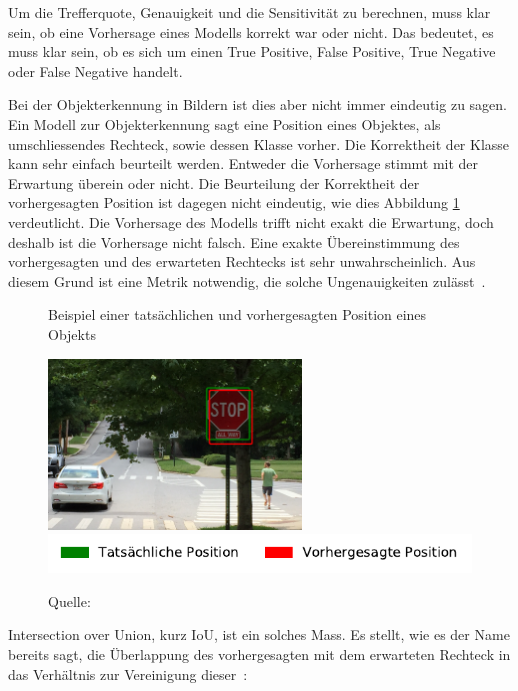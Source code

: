 Um die Trefferquote, Genauigkeit und die Sensitivität zu berechnen, muss klar sein, ob eine Vorhersage eines Modells korrekt war oder nicht. Das bedeutet, es muss klar sein, ob es sich um einen True Positive, False Positive, True Negative oder False Negative handelt. 

Bei der Objekterkennung in Bildern ist dies aber nicht immer eindeutig zu sagen. Ein Modell zur Objekterkennung sagt eine Position eines Objektes, als umschliessendes Rechteck, sowie dessen Klasse vorher. Die Korrektheit der Klasse kann sehr einfach beurteilt werden. Entweder die Vorhersage stimmt mit der Erwartung überein oder nicht. Die Beurteilung der Korrektheit der vorhergesagten Position ist dagegen nicht eindeutig, wie dies Abbildung \ref{fig:iou-issue} verdeutlicht. Die Vorhersage des Modells trifft nicht exakt die Erwartung, doch deshalb ist die Vorhersage nicht falsch. Eine exakte Übereinstimmung des vorhergesagten und des erwarteten Rechtecks ist sehr unwahrscheinlich. Aus diesem Grund ist eine Metrik notwendig, die solche Ungenauigkeiten zulässt~\autocite{IoU}.

\begin{figure}[h!]
    \captionsetup{width=.9\linewidth}
    \caption{Beispiel einer tatsächlichen und vorhergesagten Position eines Objekts}
    \label{fig:iou-issue}
    \centering
    \includegraphics[width=0.6\textwidth]{graphics/iou/iou_issue.jpg}\\
    \includegraphics[scale=1]{graphics/matplot/iou_issue_legend.pdf}
    \caption*{Quelle: \textcite{IoU}}
\end{figure}

Intersection over Union, kurz IoU, ist ein solches Mass. Es stellt, wie es der Name bereits sagt, die Überlappung des vorhergesagten mit dem erwarteten Rechteck in das Verhältnis zur Vereinigung dieser~\autocite{IoU}:

